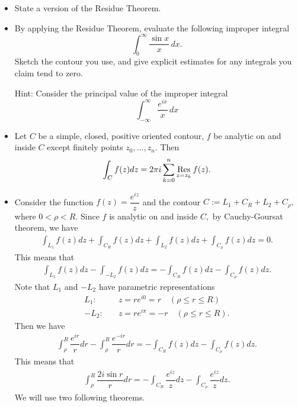 \begin{problem}
\begin{itemize}
    \item[(a)] State a version of the Residue Theorem.
    \item[(b)] By applying the Residue Theorem, evaluate the following improper integral
    $$ \int_0^\infty \frac{\sin x}{x} \,dx. $$
    Sketch the contour you use, and give explicit estimates for any integrals you claim tend to zero.
    
    Hint: Consider the principal value of the improper integral
    $$ \int_{-\infty}^\infty \frac{e^{ix}}{x} \,dx $$
\end{itemize}
\begin{solution}
\begin{itemize}
\item[(a)] Let $C$ be a simple, closed, positive oriented contour, $f$ be analytic on and inside $C$ except finitely points $z_0,\ldots,z_n$. Then 
\begin{align*}
    \int_Cf(z)dz=2\pi i\sum_{k=0}^n\mathop{\rm Res}_{z=z_k}f(z).
\end{align*}
    \item[(b)]
Consider the function $f(z)=\dfrac{e^{iz}}{z}$ and the contour $C:=L_1+C_R+L_2+C_\rho,$ where $0<\rho< R.$ 
Since $f$ is analytic on and inside $C,$ by Cauchy-Goursat theorem, we have
\begin{align*}
 \int_{L_1}f(z)dz+\int_{C_R}f(z)dz+\int_{L_2}f(z)dz+\int_{C_\rho}f(z)dz=0.
\end{align*}
This means that 
\begin{align*}
 \int_{L_1}f(z)dz-\int_{-L_2}f(z)dz=-\int_{C_R}f(z)dz-\int_{C_\rho}f(z)dz.
\end{align*}
Note that $L_1$ and $-L_2$ have parametric representations 
\begin{align*}
    L_1:&\quad z=re^{i0}=r\quad (\rho \le r\le R)\\
    -L_2:&\quad z=re^{i\pi}=-r\quad (\rho \le r\le R).
\end{align*}
Then we have 
\begin{align*}
    \int_\rho^R\dfrac{e^{ir}}{r}dr-\int_{\rho}^R\dfrac{e^{-ir}}{r}dr=-\int_{C_R}f(z)dz-\int_{C_\rho}f(z)dz.
\end{align*}
This means that
\begin{align*}
    \int_\rho^R\dfrac{2i\sin r}{r}dr=-\int_{C_R}\dfrac{e^{iz}}{z} dz-\int_{C_\rho}\dfrac{e^{iz}}{z} dz.
\end{align*}
We will use two following theorems.

\end{itemize}
\end{solution}
\end{problem}
